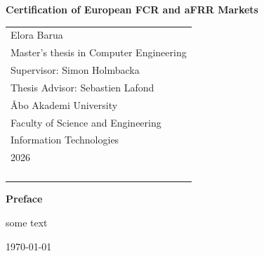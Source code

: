 \documentclass[a4paper,12pt]{report}
\newcommand{\prefacename}{Preface}
\newenvironment{preface}{
    \vspace*{\stretch{2}}
    {\noindent \bfseries \Huge \prefacename}
    \begin{center}
        \thispagestyle{plain}
    \end{center}%
}
{\vspace*{\stretch{5}}}
\begin{document}
\pagestyle{empty}    
\begingroup
{}


\begin{titlepage}
\vspace*{144pt}
\begin{center}
\Huge\bf Certification of European FCR and aFRR Markets %
\end{center}
\enlargethispage{3cm}
\vfill

\hfill
\begin{tabular}[t]{l@{}}%
Elora Barua\\
Master's thesis in Computer Engineering\\ %
Supervisor: Simon Holmbacka\\ %
Thesis Advisor: Sebastien Lafond\\
Åbo Akademi University\\
Faculty of Science and Engineering\\
Information Technologies\\
2026\\ %
\\
\\
\\
\\
\end{tabular}
\end{titlepage}
\begin{abstract}
     Abstract    \\\\
    \textbf{Keywords:}
    keywords

\end{abstract}
\clearpage
\begin{preface}
    some text
    \newline
    \newline
    \newline
    
    \today
\end{preface}
\clearpage
% 

% 


\tableofcontents 

\endgroup %

\clearpage
\pagestyle{plain}      


 
 
 


\nocite{*} %
\printbibliography[title={References}] %
\end{document}
